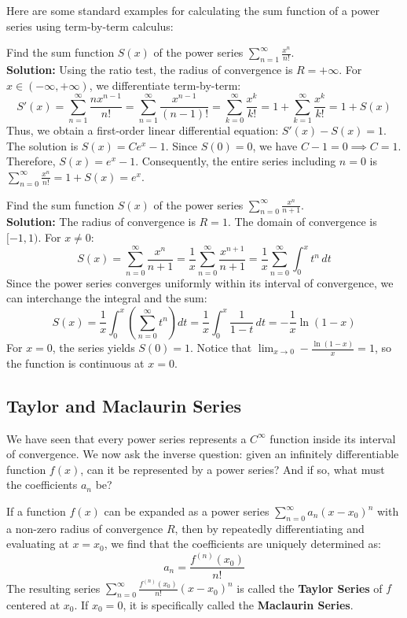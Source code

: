 Here are some standard examples for calculating the sum function of a power series using term-by-term calculus:

\begin{example}
Find the sum function $S(x)$ of the power series $\sum_{n=1}^{\infty} \frac{x^n}{n!}$.
\\ \textbf{Solution:} Using the ratio test, the radius of convergence is $R = +\infty$. For $x \in (-\infty, +\infty)$, we differentiate term-by-term:
\[ S'(x) = \sum_{n=1}^{\infty} \frac{n x^{n-1}}{n!} = \sum_{n=1}^{\infty} \frac{x^{n-1}}{(n-1)!} = \sum_{k=0}^{\infty} \frac{x^k}{k!} = 1 + \sum_{k=1}^{\infty} \frac{x^k}{k!} = 1 + S(x) \]
Thus, we obtain a first-order linear differential equation: $S'(x) - S(x) = 1$. The solution is $S(x) = C e^x - 1$.
Since $S(0) = 0$, we have $C - 1 = 0 \implies C = 1$. Therefore, $S(x) = e^x - 1$.
Consequently, the entire series including $n=0$ is $\sum_{n=0}^{\infty} \frac{x^n}{n!} = 1 + S(x) = e^x$.
\end{example}

\begin{example}
Find the sum function $S(x)$ of the power series $\sum_{n=0}^{\infty} \frac{x^n}{n+1}$.
\\ \textbf{Solution:} The radius of convergence is $R = 1$. The domain of convergence is $[-1, 1)$.
For $x \neq 0$:
\[ S(x) = \sum_{n=0}^{\infty} \frac{x^n}{n+1} = \frac{1}{x} \sum_{n=0}^{\infty} \frac{x^{n+1}}{n+1} = \frac{1}{x} \sum_{n=0}^{\infty} \int_0^x t^n \, dt \]
Since the power series converges uniformly within its interval of convergence, we can interchange the integral and the sum:
\[ S(x) = \frac{1}{x} \int_0^x \left(\sum_{n=0}^{\infty} t^n\right) dt = \frac{1}{x} \int_0^x \frac{1}{1-t} \, dt = -\frac{1}{x} \ln(1-x) \]
For $x = 0$, the series yields $S(0) = 1$. Notice that $\lim_{x \to 0} -\frac{\ln(1-x)}{x} = 1$, so the function is continuous at $x = 0$.
\end{example}

\subsection{Taylor and Maclaurin Series}

We have seen that every power series represents a $C^\infty$ function inside its interval of convergence. We now ask the inverse question: given an infinitely differentiable function $f(x)$, can it be represented by a power series? And if so, what must the coefficients $a_n$ be?


\begin{theorem}
If a function $f(x)$ can be expanded as a power series $\sum_{n=0}^{\infty} a_n (x-x_0)^n$ with a non-zero radius of convergence $R$, then by repeatedly differentiating and evaluating at $x=x_0$, we find that the coefficients are uniquely determined as:
\[ a_n = \frac{f^{(n)}(x_0)}{n!} \]
The resulting series $\sum_{n=0}^{\infty} \frac{f^{(n)}(x_0)}{n!} (x-x_0)^n$ is called the \textbf{Taylor Series} of $f$ centered at $x_0$. If $x_0=0$, it is specifically called the \textbf{Maclaurin Series}.
\end{theorem}

